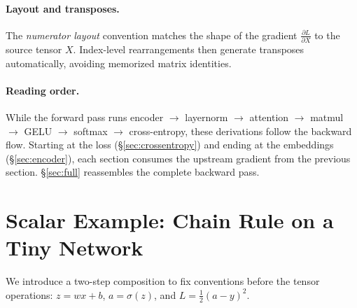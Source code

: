 \documentclass[letterpaper, 10 pt, conference]{ieeeconf}
\newcommand{\pdv}[2]{\frac{\partial #1}{\partial #2}}
\newcommand{\dL}[1]{\pdv{L}{#1}}
\theoremstyle{definition}
\begin{document}
\paragraph{Layout and transposes.}
The \emph{numerator layout} convention matches the shape of the gradient $\dL{X}$ to the source tensor $X$. Index-level rearrangements then generate transposes automatically, avoiding memorized matrix identities.

\paragraph{Reading order.}
While the forward pass runs encoder $\to$ layernorm $\to$ attention $\to$ matmul $\to$ GELU $\to$ softmax $\to$ cross-entropy, these derivations follow the backward flow. Starting at the loss (\S\ref{sec:crossentropy}) and ending at the embeddings (\S\ref{sec:encoder}), each section consumes the upstream gradient from the previous section. \S\ref{sec:full} reassembles the complete backward pass.


\section{Scalar Example: Chain Rule on a Tiny Network}\label{sec:example}

We introduce a two-step composition to fix conventions before the tensor operations:
$z = wx + b$, $a = \sigma(z)$, and $L = \tfrac{1}{2}(a - y)^2$.
\end{document}
